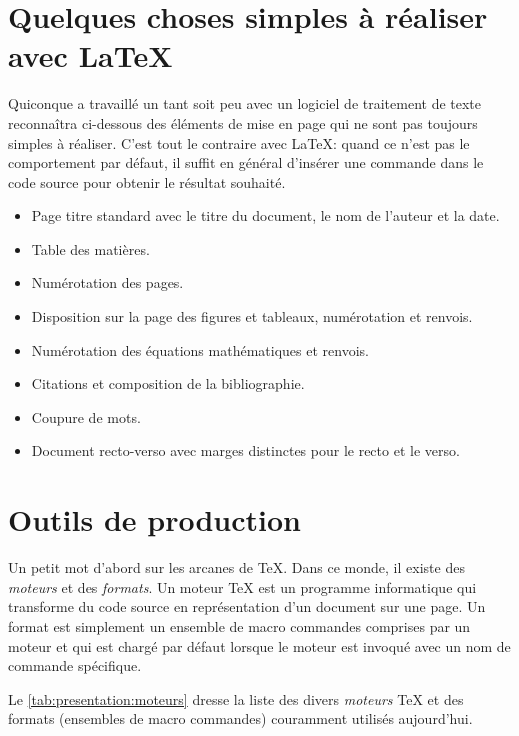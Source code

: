 \section{Quelques choses simples à réaliser avec {\LaTeX}}

Quiconque a travaillé un tant soit peu avec un logiciel de traitement
de texte reconnaîtra ci-dessous des éléments de mise en page qui ne
sont pas toujours simples à réaliser. C'est tout le contraire avec
{\LaTeX}: quand ce n'est pas le comportement par défaut, il suffit en
général d'insérer une commande dans le code source pour obtenir le
résultat souhaité.

\begin{itemize}
\item Page titre standard avec le titre du document, le nom de
  l'auteur et la date.
\item Table des matières.
\item Numérotation des pages.
\item Disposition sur la page des figures et tableaux, numérotation et
  renvois.
\item Numérotation des équations mathématiques et renvois.
\item Citations et composition de la bibliographie.
\item Coupure de mots.
\item Document recto-verso avec marges distinctes pour le recto et le
  verso.
\end{itemize}


\section{Outils de production}

Un petit mot d'abord sur les arcanes de {\TeX}. Dans ce monde, il
existe des \emph{moteurs} et des \emph{formats}. Un moteur {\TeX} est
un programme informatique qui transforme du code source en
représentation d'un document sur une page. Un format est simplement un
ensemble de macro commandes comprises par un moteur et qui est chargé
par défaut lorsque le moteur est invoqué avec un nom de commande
spécifique.

Le \autoref{tab:presentation:moteurs} dresse la liste des divers
\emph{moteurs} {\TeX} et des formats (ensembles de macro commandes)
couramment utilisés aujourd'hui.


